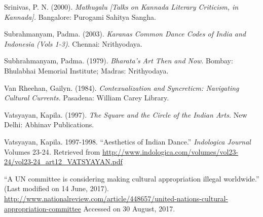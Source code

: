 \begin{thebibliography}{99}
  Srinivas, P. N. (2000). \textit{Mathugalu [Talks on Kannada Literary Criticism, in Kannada].} Bangalore: Purogami Sahitya Sangha.

  Subrahmanyam, Padma. (2003). \textit{Karanas Common Dance Codes of India and Indonesia (Vols 1-3)}. Chennai: Nrithyodaya.

  Subhrahmanyam, Padma. (1979). \textit{Bharata’s Art Then and Now}. Bombay: Bhulabhai Memorial Institute; Madras: Nrithyodaya.

  Van Rheehan, Gailyn. (1984). \textit{Contexualization and Syncreticm: Navigating Cultural Currents.} Pasadena: William Carey Library.

  Vatsyayan, Kapila. (1997). \textit{The Square and the Circle of the Indian Arts.} New Delhi: Abhinav Publications.

  Vatsyayan, Kapila. 1997-1998. “Aesthetics of Indian Dance.” \textit{Indologica Journal }Volumes 23-24\textit{. }Retrieved from \url{http://www.indologica.com/volumes/vol23-24/vol23-24_art12_VATSYAYAN.pdf}

  “A UN committee is considering making cultural appropriation illegal worldwide.” (Last modified on 14 June, 2017). \url{http://www.nationalreview.com/article/448657/united-nations-cultural-appropriation-committee} Accessed on 30 August, 2017.

 \end{thebibliography}

